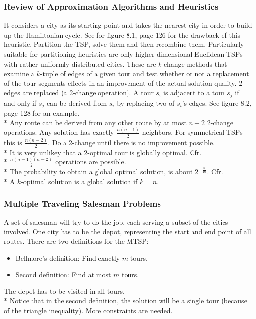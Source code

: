 \documentclass[12pt]{article}
\newcounter{subsubsubsection}[subsubsection]
\begin{document}
\subsubsection{Review of Approximation Algorithms and Heuristics}
It considers a city as its starting point and takes the nearest city in order to build up the Hamiltonian cycle. See for figure 8.1, page 126 for the drawback of this heuristic.
Partition the TSP, solve them and then recombine them. Particularly suitable for partitioning heuristics are only higher dimensional Euclidean TSPs with rather uniformly distributed cities.
These are $k$-change methods that examine a $k$-tuple of edges of a given tour and test whether or not a replacement of the tour segments effects in an improvement of the actual solution quality.
2 edges are replaced (a 2-change operation). A tour $s_i$ is adjacent to a tour $s_j$ if and only if $s_j$ can be derived from $s_i$ by replacing two of $s_i$'s edges. See figure 8.2, page 128 for an example.\\*
Any route can be derived from any other route by at most $n-2$ 2-change operations. Any solution has exactly $\frac{n(n-1)}{2}$ neighbors. For symmetrical TSPs this is $\frac{n(n-2)}{2}$. Do a 2-change until there is no improvement possible.\\*
It is very unlikey that a 2-optimal tour is globally optimal.
Cfr.\\*
$\frac{n(n-1)(n-2)}{2}$ operations are possible.\\*
The probability to obtain a global optimal solution, is about $2^{-\frac{n}{10}}$.
Cfr.\\*
A $k$-optimal solution is a global solution if $k = n$.
\subsubsection{Multiple Traveling Salesman Problems}
A set of salesman will try to do the job, each serving a subset of the cities involved. One city has to be the depot, representing the start and end point of all routes. There are two definitions for the MTSP:
\begin{itemize}
\item Bellmore's definition: Find exactly $m$ tours.
\item Second definition: Find at most $m$ tours.
\end{itemize}
The depot has to be visited in all tours.\\*
Notice that in the second definition, the solution will be a single tour (because of the triangle inequality). More constraints are needed.
\end{document}
